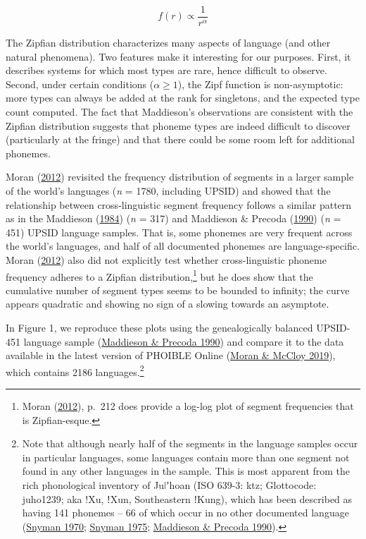 \documentclass[
]{article}
\begin{document}
\[
f(r) \propto \frac{1}{r^\alpha}
\]

The Zipfian distribution characterizes many aspects of language (and
other natural phenomena). Two features make it interesting for our
purposes. First, it describes systems for which most types are rare,
hence difficult to observe. Second, under certain conditions
(\(\alpha \ge 1\)), the Zipf function is non-asymptotic: more types can
always be added at the rank for singletons, and the expected type count
computed. The fact that Maddieson's observations are consistent with the
Zipfian distribution suggests that phoneme types are indeed difficult to
discover (particularly at the fringe) and that there could be some room
left for additional phonemes.

Moran (\protect\hyperlink{ref-Moran2012}{2012}) revisited the frequency
distribution of segments in a larger sample of the world's languages
(\emph{n} = 1780, including UPSID) and showed that the relationship
between cross-linguistic segment frequency follows a similar pattern as
in the Maddieson (\protect\hyperlink{ref-Maddieson1984}{1984}) (\emph{n}
= 317) and Maddieson \& Precoda
(\protect\hyperlink{ref-MaddiesonPrecoda1990}{1990}) (\emph{n} = 451)
UPSID language samples. That is, some phonemes are very frequent across
the world's languages, and half of all documented phonemes are
language-specific. Moran (\protect\hyperlink{ref-Moran2012}{2012}) also
did not explicitly test whether cross-linguistic phoneme frequency
adheres to a Zipfian distribution,\footnote{Moran
  (\protect\hyperlink{ref-Moran2012}{2012}), p.~212 does provide a
  log-log plot of segment frequencies that is Zipfian-esque.} but he
does show that the cumulative number of segment types seems to be
bounded to infinity; the curve appears quadratic and showing no sign of
a slowing towards an asymptote.

In Figure 1, we reproduce these plots using the genealogically balanced
UPSID-451 language sample
(\protect\hyperlink{ref-MaddiesonPrecoda1990}{Maddieson \& Precoda
1990}) and compare it to the data available in the latest version of
PHOIBLE Online (\protect\hyperlink{ref-MoranMcCloy2019}{Moran \& McCloy
2019}), which contains 2186 languages.\footnote{Note that although
  nearly half of the segments in the language samples occur in
  particular languages, some languages contain more than one segment not
  found in any other languages in the sample. This is most apparent from
  the rich phonological inventory of Juǀʼhoan (ISO 639-3: ktz;
  Glottocode: juho1239; aka !Xu, ǃXun, Southeastern ǃKung), which has
  been described as having 141 phonemes -- 66 of which occur in no other
  documented language (\protect\hyperlink{ref-Snyman1970}{Snyman 1970};
  \protect\hyperlink{ref-Snyman1975}{Snyman 1975};
  \protect\hyperlink{ref-MaddiesonPrecoda1990}{Maddieson \& Precoda
  1990}).}
\end{document}
